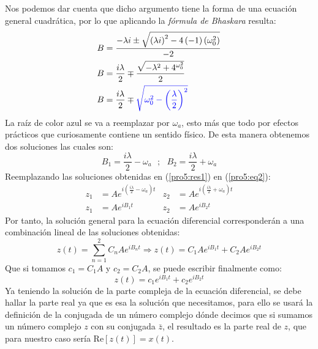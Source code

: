 \begin{multicols}{2}
Nos podemos dar cuenta que dicho argumento tiene la forma de una ecuación general cuadrática, por lo que aplicando la \textit{fórmula de Bhaskara} resulta:
\begin{align*}
    B &= \frac{-\lambda i \pm \sqrt{\left(\lambda i\right)^{2} -4\left(-1\right)\left(\omega_{0}^{2}\right)}}{-2}\\
    B &= \frac{i\lambda}{2} \mp \frac{\sqrt{-\lambda^{2} + 4^{\omega_{0}^{2}}}}{2}\\
    B &= \frac{i\lambda}{2} \mp \textcolor{azul}{\sqrt{\omega_{0}^{2} - \left(\frac{\lambda}{2}\right)^{2}}}
\end{align*}
La raíz de color azul se va a reemplazar por $\omega_a$, esto más que todo por efectos prácticos que curiosamente contiene un sentido físico. De esta manera obtenemos dos soluciones las cuales son:
\begin{equation}
    B_{1} = \frac{i \lambda}{2} - \omega_a ~~~;~~~ B_{2} = \frac{i \lambda}{2} + \omega_a \label{pro5:res1}
\end{equation}
Reemplazando las soluciones obtenidas en (\ref{pro5:res1}) en (\ref{pro5:eq2}):
\begin{align*}
    z_1 &= Ae^{i\left(\frac{i \lambda}{2} - \omega_a\right)t} & z_2 &= Ae^{i\left(\frac{i \lambda}{2} + \omega_a\right)t}\\
    z_1 &= Ae^{iB_{1}t} & z_2 &= Ae^{iB_{2}t}
\end{align*}
Por tanto, la solución general para la ecuación diferencial corresponderán a una combinación lineal de las soluciones obtenidas:
\begin{equation*}
    z(t) = \sum_{n=1}^{2} C_{n} Ae^{iB_{n}t} \Rightarrow z(t) = C_{1} Ae^{iB_{1}t} + C_{2} Ae^{iB_{2}t}
\end{equation*}
Que si tomamos $c_{1} = C_{1}A$ y $c_{2} = C_{2}A$, se puede escribir finalmente como:
\begin{equation}
    z(t) = c_{1} e^{iB_{1}t} + c_{2} e^{iB_{2}t} \label{pro5:res2}
\end{equation}
Ya teniendo la solución de la parte compleja de la ecuación diferencial, se debe hallar la parte real ya que es esa la solución que necesitamos, para ello se usará la definición de la conjugada de un número complejo dónde decimos que si sumamos un número complejo $z$ con su conjugada $\bar{z}$, el resultado es la parte real de $z$, que para nuestro caso sería $\mathrm{Re}[z(t)] = x(t)$.


\end{multicols}
